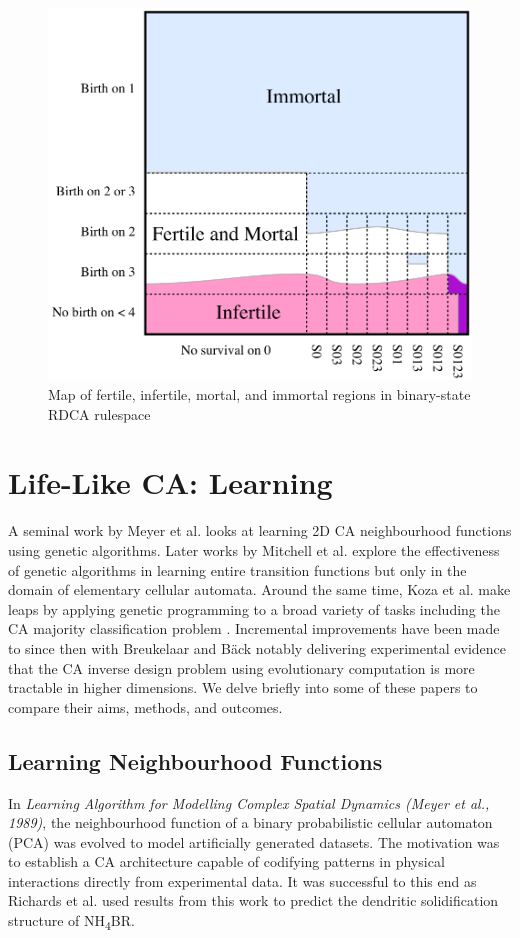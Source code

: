 \begin{figure}[!h]
\centering
    \includegraphics[width=.5\textwidth]{images/eppstein-map.png}
    \caption{Map of fertile, infertile, mortal, and immortal regions in binary-state RDCA rulespace \cite{eppstein2010growth}}
\label{fig:eppstein-map}
\end{figure}

\section{Life-Like CA: Learning}

A seminal work by Meyer et al.\cite{meyer1989learning} looks at learning 2D CA neighbourhood functions using genetic algorithms. Later works by Mitchell et al. \cite{mitchell1996evolving} explore the effectiveness of genetic algorithms in learning entire transition functions but only in the domain of elementary cellular automata. Around the same time, Koza et al. make leaps by applying genetic programming to a broad variety of tasks including the CA majority classification problem \cite{andre1996discovery}. Incremental improvements have been made to since then with Breukelaar and B{\"a}ck notably delivering experimental evidence that the CA inverse design problem using evolutionary computation is more tractable in higher dimensions\cite{breukelaar2005using}. We delve briefly into some of these papers to compare their aims, methods, and outcomes.

\subsection{Learning Neighbourhood Functions}

In \textit{Learning Algorithm for Modelling Complex Spatial Dynamics (Meyer et al., 1989)}\cite{meyer1989learning}, the neighbourhood function of a binary probabilistic cellular automaton (PCA) was evolved to model artificially generated datasets. The motivation was to establish a CA architecture capable of codifying patterns in physical interactions directly from experimental data. It was successful to this end as Richards et al.\cite{richards1990extracting} used results from this work to predict the dendritic solidification structure of NH\textsubscript{4}BR.

